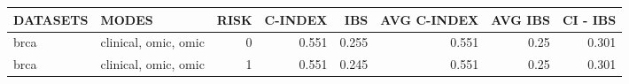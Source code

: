 \begin{tabular}{llrrrrrr}
\hline
 DATASETS   & MODES                &   RISK &   C-INDEX &   IBS &   AVG C-INDEX &   AVG IBS &   CI - IBS \\
\hline
 brca       & clinical, omic, omic &      0 &     0.551 & 0.255 &         0.551 &      0.25 &      0.301 \\
 brca       & clinical, omic, omic &      1 &     0.551 & 0.245 &         0.551 &      0.25 &      0.301 \\
\hline
\end{tabular}